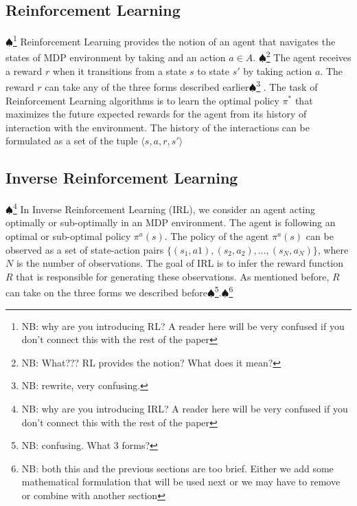\documentclass[conference]{IEEEtran}
\newcommand\NB[1]{$\spadesuit$\footnote{NB: #1}}
\begin{document}
\subsection{Reinforcement Learning}
\NB{why are you introducing RL? A reader here will be very confused if you don't connect this with the rest of the paper} Reinforcement Learning provides the notion of an agent that navigates the states of MDP environment by taking and an action $a \in A$. \NB{What??? RL provides the notion? What does it mean?} The agent receives a reward $r$ when it transitions from a state $s$ to state $s'$ by taking action $a$. The reward $r$ can take any of the three forms described earlier\NB{rewrite, very confusing.} . The task of Reinforcement Learning algorithms is to learn the optimal policy $\pi^*$ that maximizes the future expected rewards for the agent from its history of interaction with the environment. The history of the interactions can be formulated as a set of the tuple $\big \langle s,a,r,s' \big \rangle$
\subsection{Inverse Reinforcement Learning}
\NB{why are you introducing IRL? A reader here will be very confused if you don't connect this with the rest of the paper} In Inverse Reinforcement Learning (IRL), we consider an agent acting optimally or sub-optimally in an MDP environment. The agent is following an optimal or sub-optimal policy $\pi^a(s)$. The policy of the agent $\pi^a(s)$ can be observed as a set of state-action pairs $\{(s_1,a1),(s_2,a_2), ...,(s_N,a_N)\}$, where $N$ is the number of observations. The goal of IRL is to infer the reward function $R$ that is responsible for generating these observations. As mentioned before, $R$ can take on the three forms we described before\NB{confusing. What 3 forms?}.\NB{both this and the previous sections are too brief. Either we add some mathematical formulation that will be used next or we may have to remove or combine with another section}
\end{document}
